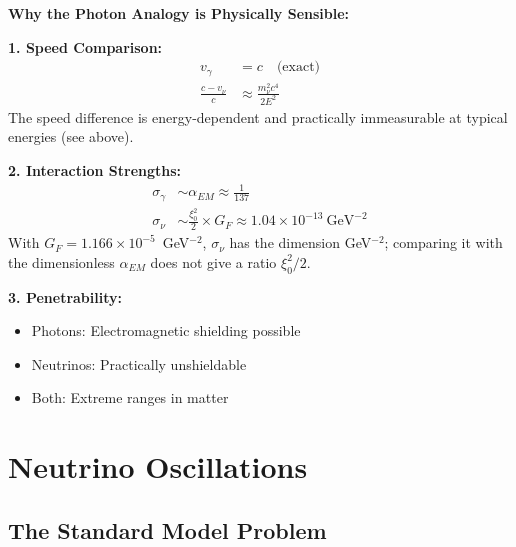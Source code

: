 	\begin{photon}
		\textbf{Why the Photon Analogy is Physically Sensible:}
		
		\textbf{1. Speed Comparison:}
		\begin{align}
			v_\gamma &= c \quad \text{(exact)} \\
			\frac{c - v_\nu}{c} &\approx \frac{m_\nu^2 c^4}{2E^2}
		\end{align}
		The speed difference is energy-dependent and practically immeasurable at typical energies (see above).
		
		\textbf{2. Interaction Strengths:}
		\begin{align}
			\sigma_\gamma &\sim \alpha_{EM} \approx \frac{1}{137} \\
			\sigma_\nu &\sim \frac{\xi_0^2}{2} \times G_F \approx 1.04 \times 10^{-13}\ \text{GeV}^{-2}
		\end{align}
		With $G_F = 1.166 \times 10^{-5}$~GeV$^{-2}$, $\sigma_\nu$ has the dimension GeV$^{-2}$; comparing it with the dimensionless $\alpha_{EM}$ does not give a ratio $\xi_0^2/2$.
		
		\textbf{3. Penetrability:}
		\begin{itemize}
			\item Photons: Electromagnetic shielding possible
			\item Neutrinos: Practically unshieldable
			\item Both: Extreme ranges in matter
		\end{itemize}
	\end{photon}
	
	\section{Neutrino Oscillations}
	
	\subsection{The Standard Model Problem}
	
